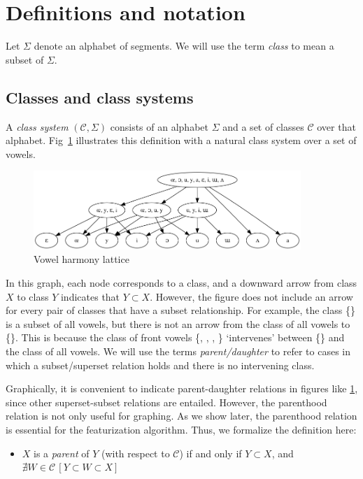 \documentclass[11pt, oneside]{article}   	%
\begin{document}
\section{Definitions and notation}

Let $\Sigma$ denote an alphabet of segments. We will use the term \textit{class} to mean a subset of $\Sigma$.

\subsection{Classes and class systems}

A \textit{class system} $(\mathcal C, \Sigma)$ consists of an alphabet $\Sigma$ and a set of classes $\mathcal C$ over that alphabet. Fig~\ref{fig:lattice} illustrates this definition with a natural class system over a set of vowels.

\begin{figure}[h]
\includegraphics[width=0.9\textwidth]{vowelHarmony_unicode.png}
\caption{Vowel harmony lattice}
\label{fig:lattice}
\end{figure}

In this graph, each node corresponds to a class, and a downward arrow from class $X$ to class $Y$ indicates that $Y \subset X$. However, the figure does not include an arrow for every pair of classes that have a subset relationship. For example, the class \{\} is a subset of all vowels, but there is not an arrow from the class of all vowels to \{\}. This is because the class of front vowels \{\textipa{\oe}, , , \} `intervenes' between \{\} and the class of all vowels. We will use the terms \textit{parent/daughter} to refer to cases in which a subset/superset relation holds and there is no intervening class.

Graphically, it is convenient to indicate parent-daughter relations in figures like \ref{fig:lattice}, since other superset-subset relations are entailed. However, the parenthood relation is not only useful for graphing. As we show later, the parenthood relation is essential for the featurization algorithm. Thus, we formalize the definition here: \begin{itemize}
    \item $X$ is a \textit{parent} of $Y$ (with respect to $\mathcal C$) if and only if $Y \subset X$, and $\nexists W \in \mathcal C \, [Y \subset W \subset X]$
    \end{itemize}
\end{document}
